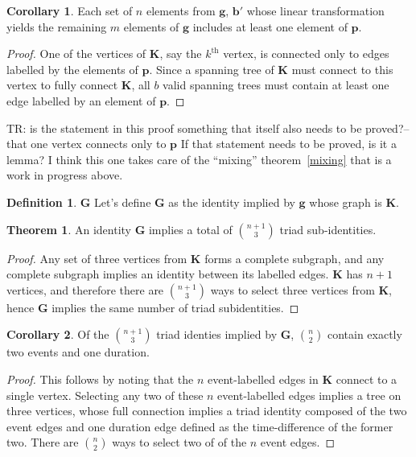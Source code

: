 \documentclass[12pt,oneside,a4paper]{article} %
\theoremstyle{definition}
\newtheorem{definition}{Definition}[section]
\newtheorem{theorem}{Theorem}[section]
\newtheorem{corollary}{Corollary}[theorem]
\newcommand\vt[1]{\textcolor{rd}{#1}}
\begin{document}
\begin{appendices}
\begin{corollary}
Each set of $n$ elements from $\textbf{g}$, $\textbf{b}'$ whose linear
transformation yields the remaining $m$ elements of $\textbf{g}$ includes at
least one element of $\textbf{p}$.
\end{corollary}

\begin{proof}
One of the vertices of $\textbf{K}$, say the $k^{\text{th}}$ vertex, is
connected only to edges labelled by the elements of $\textbf{p}$. Since a
spanning tree of $\textbf{K}$ must connect to this vertex to fully connect
$\textbf{K}$, all $b$ valid spanning trees must contain at least one edge
labelled by an element of $\textbf{p}$.
\end{proof}

\vt{TR: is the statement in this proof something that itself also needs to be
proved?-- that one vertex connects only to $\textbf{p}$ If that statement needs
to be proved, is it a lemma? I think this one takes care of the ``mixing''
theorem~\ref{mixing} that is a work in progress above.}

\begin{definition}{$\textbf{G}$}
Let's define $\textbf{G}$ as the identity implied by $\textbf{g}$ whose
graph is $\textbf{K}$.
\end{definition}

\begin{theorem}
An identity $\textbf{G}$ implies a total of $\binom{n+1}{3}$ triad
sub-identities.
\end{theorem}

\begin{proof}
Any set of three vertices from $\textbf{K}$ forms a complete subgraph, and any
complete subgraph implies an identity between its labelled edges. $\textbf{K}$
has $n+1$ vertices, and therefore there are $\binom{n+1}{3}$ ways to select
three vertices from $\textbf{K}$, hence $\textbf{G}$ implies the same number of
triad subidentities.
\end{proof}

\begin{corollary}
Of the $\binom{n+1}{3}$ triad identies implied by $\textbf{G}$, $\binom{n}{2}$
contain exactly two events and one duration.
\end{corollary}

\begin{proof}
This follows by noting that the $n$ event-labelled edges in $\textbf{K}$ connect
to a single vertex. Selecting any two of these $n$ event-labelled edges implies
a tree on three vertices, whose full connection implies a triad identity
composed of the two event edges and one duration edge defined as the time-difference of the
former two. There are $\binom{n}{2}$ ways to select two of of the $n$ event
edges.
\end{proof}


\end{appendices}
\end{document}
